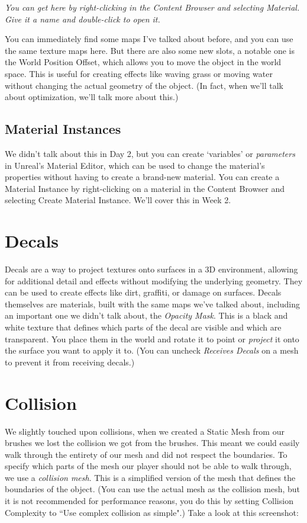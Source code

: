 \documentclass{article}
\begin{document}
\textit{You can get here by right-clicking in the Content Browser and selecting Material. Give it a name and double-click to open it.}

You can immediately find some maps I've talked about before, and you can use the same texture maps here. But there are also some new slots, a notable one is the World Position Offset, which allows you to move the object in the world space. This is useful for creating effects like waving grass or moving water without changing the actual geometry of the object. (In fact, when we'll talk about optimization, we'll talk more about this.)

\subsection{Material Instances}
We didn't talk about this in Day 2, but you can create `variables' or \textit{parameters} in Unreal's Material Editor, which can be used to change the material's properties without having to create a brand-new material. You can create a Material Instance by right-clicking on a material in the Content Browser and selecting Create Material Instance. We'll cover this in Week 2.

\section{Decals}

Decals are a way to project textures onto surfaces in a 3D environment, allowing for additional detail and effects without modifying the underlying geometry. They can be used to create effects like dirt, graffiti, or damage on surfaces. Decals themselves are materials, built with the same maps we've talked about, including an important one we didn't talk about, the \textit{Opacity Mask}. This is a black and white texture that defines which parts of the decal are visible and which are transparent. You place them in the world and rotate it to point or \emph{project} it onto the surface you want to apply it to. (You can uncheck \emph{Receives Decals} on a mesh to prevent it from receiving decals.)

\section{Collision}

We slightly touched upon collisions, when we created a Static Mesh from our brushes we lost the collision we got from the brushes. This meant we could easily walk through the entirety of our mesh and did not respect the boundaries. To specify which parts of the mesh our player should not be able to walk through, we use a \textit{collision mesh}. This is a simplified version of the mesh that defines the boundaries of the object. (You can use the actual mesh as the collision mesh, but it is not recommended for performance reasons, you do this by setting Collision Complexity to ``Use complex collision as simple".) Take a look at this screenshot:
\end{document}
